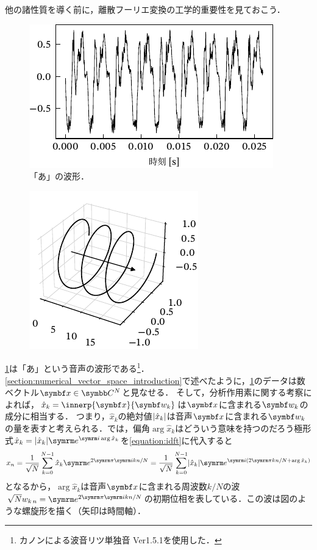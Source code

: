 \documentclass[../../main]{subfiles}
\begin{document}
他の諸性質を導く前に，離散フーリエ変換の工学的重要性を見ておこう．

\begin{figure}[htbp]
  \centering
  \includegraphics{figures/time_domain.pdf}
  \caption{「あ」の波形．}
  \label{figure:time_domain}
\end{figure}

\begin{figure}
  \includegraphics{figures/helix.pdf}
\end{figure}

\cref{figure:time_domain}は「あ」という音声の波形である\footnote{カノン\cite{canon}による波音リツ単独音 Ver1.5.1を使用した．}．
\cref{section:numerical_vector_space_introduction}で述べたように，\cref{figure:time_domain}のデータは数ベクトル\(\vect{x}\in\numset{C}^N\)と見なせる．
そして，分析作用素に関する考察によれば，\(\hat{x}_k=\innerp{\vect{x}}{\vect{w}_k}\)は\(\vect{x}\)に含まれる\(\vect{w}_k\)の成分に相当する．
つまり，\(\hat{x}_k\)の絶対値\(\lvert\hat{x}_k\rvert\)は音声\(\vect{x}\)に含まれる\(\vect{w}_k\)の量を表すと考えられる．では，偏角\(\arg\hat{x}_k\)はどういう意味を持つのだろう\？極形式\(\hat{x}_k=\abs{\hat{x}_k}\napr^{\iuni\arg\hat{x}_k}\)を\cref{equation:idft}に代入すると
\[
  x_n = \frac{1}{\sqrt{N}}\sum_{k=0}^{N-1}\hat{x}_k\napr^{2\krez\iuni kn/N}
  = \frac{1}{\sqrt{N}}\sum_{k=0}^{N-1}\abs{\hat{x}_k}\napr^{\iuni(2\krez kn/N+\arg\hat{x}_k)}
\]
となるから，\(\arg\hat{x}_k\)は音声\(\vect{x}\)に含まれる周波数\(k/N\)の波\(\sqrt{N}\midx{w}{k}{n}=\napr^{2\krez\iuni kn/N}\)の初期位相を表している．この波は図のような螺旋形を描く（矢印は時間軸）．
\end{document}
